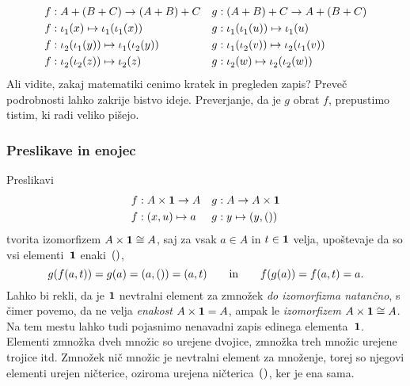 %
\begin{align*}
  f &:  A + (B + C) \to (A + B) + C &
  g &: (A + B) + C \to A + (B + C) \\
  f &: \inl(x)             \mapsto \inl(\inl(x)) &
  g &: \inl(\inl(u)) \mapsto \inl(u)\\
  f &: \inr(\inl(y)) \mapsto \inl(\inr(y)) &
  g &: \inl(\inr(v)) \mapsto \inr(\inl(v))  \\
  f &: \inr(\inr(z)) \mapsto \inr(z) &
  g &: \inr(w)              \mapsto \inr(\inr(w))
\end{align*}
%
Ali vidite, zakaj matematiki cenimo kratek in pregleden zapis? Preveč podrobnosti lahko
zakrije bistvo ideje. Preverjanje, da je $g$ obrat $f$, prepustimo tistim, ki radi veliko
pišejo.

\subsubsection{Preslikave in enojec}
\label{sec:preslikave-enojec}

Preslikavi
%
\begin{align*}
  f &: A \times \mathtt{\mathbf{1}} \to A &
  g &: A \to A \times \mathtt{\mathbf{1}} \\
  f &: (x, u) \mapsto a &
  g &: y \mapsto (y, \mathord{()})
\end{align*}
%
tvorita izomorfizem $A \times \mathtt{\mathbf{1}} \cong A$, saj za vsak $a \in A$ in $t \in \mathtt{\mathbf{1}}$ velja,
upoštevaje da so vsi elementi~$\mathtt{\mathbf{1}}$ enaki~$\mathord{()}$,
%
\begin{equation*}
  g(f(a, t)) = g(a) = (a, \mathord{()}) = (a, t)
  \qquad\text{in}\qquad
  f(g(a)) = f(a, t) = a.
\end{equation*}
%
Lahko bi rekli, da je $\mathtt{\mathbf{1}}$ nevtralni element za zmnožek \emph{do izomorfizma natančno},
s čimer povemo, da ne velja \emph{enakost} $A \times \mathtt{\mathbf{1}} = A$, ampak le
\emph{izomorfizem} $A \times \mathtt{\mathbf{1}} \cong A$. Na tem mestu lahko tudi pojasnimo nenavadni
zapis edinega elementa~$\mathtt{\mathbf{1}}$. Elementi zmnožka dveh množic so urejene dvojice, zmnožka
treh množic urejene trojice itd. Zmnožek nič množic je nevtralni element za množenje,
torej so njegovi elementi urejen ničterice, oziroma urejena ničterica~$\mathord{()}$, ker je ena
sama.

